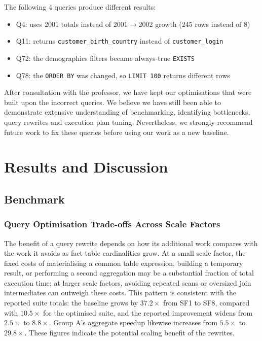 \documentclass{ULBreport}
\begin{document}
The following 4 queries produce different results:

\begin{itemize}
    \item Q4: uses 2001 totals instead of 2001$\rightarrow$2002 growth (245 rows instead of 8)
    \item Q11: returns \texttt{customer\_birth\_country} instead of \texttt{customer\_login}
    \item Q72: the demographics filters became always-true \texttt{EXISTS}
    \item Q78: the \texttt{ORDER BY} was changed, so \texttt{LIMIT 100} returns different rows
\end{itemize}

After consultation with the professor, we have kept our optimisations that were built upon the incorrect queries. We believe we have still been able to demonstrate extensive understanding of benchmarking, identifying bottlenecks, query rewrites and execution plan tuning. Nevertheless, we strongly recommend future work to fix these queries before using our work as a new baseline.

\chapter{Results and Discussion}

\section{Benchmark}
\label{sec:benchmark}

\subsection{Query Optimisation Trade-offs Across Scale Factors}

The benefit of a query rewrite depends on how its additional work compares with the work it avoids as fact-table cardinalities grow. At a small scale factor, the fixed costs of materialising a common table expression, building a temporary result, or performing a second aggregation may be a substantial fraction of total execution time; at larger scale factors, avoiding repeated scans or oversized join intermediates can outweigh these costs. This pattern is consistent with the reported suite totals: the baseline grows by $37.2\times$ from SF1 to SF8, compared with $10.5\times$ for the optimised suite, and the reported improvement widens from $2.5\times$ to $8.8\times$. Group A's aggregate speedup likewise increases from $5.5\times$ to $29.8\times$. These figures indicate the potential scaling benefit of the rewrites.
\end{document}
